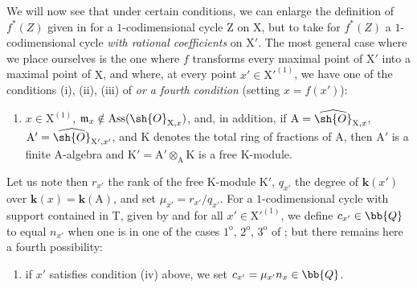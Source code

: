 \begin{env}[21.10.10]
\label{IV.21.10.10}
We will now see that under certain conditions, we can enlarge the definition of $f^*(Z)$ given in  for a $1$-codimensional cycle $\mathrm{Z}$ on $\mathrm{X}$, but to take for $f^*(Z)$ a $1$-codimensional cycle \emph{with rational coefficients} on $\mathrm{X}'$.
The most general case where we place ourselves is the one where $f$ transforms every maximal point of $\mathrm{X}'$ into a maximal point of $\mathrm{X}$, and where, at every point $x'\in\mathrm{X}'^{(1)}$, we have one of the conditions (i), (ii), (iii) of  \emph{or a fourth condition} (setting $x=f(x')$):
\begin{enumerate}
  \item[(iv)] $x\in\mathrm{X}^{(1)}$, $\mathfrak{m}_{x}\notin\operatorname{Ass}(\sh{O}_{\mathrm{X},x})$, and, in addition, if $\mathrm{A}=\widehat{\sh{O}}_{\mathrm{X},x}$, $\mathrm{A}'=\widehat{\sh{O}}_{\mathrm{X}',x'}$, and $\mathrm{K}$ denotes the total ring of fractions of $\mathrm{A}$, then $\mathrm{A}'$ is a finite $\mathrm{A}$-algebra and $\mathrm{K}'=\mathrm{A}'\otimes_{\mathrm{A}}\mathrm{K}$ is a free $\mathrm{K}$-module.
\end{enumerate}

Let us note then $r_{x'}$ the rank of the free $\mathrm{K}$-module $\mathrm{K}'$, $q_{x'}$ the degree of $\boldsymbol{k}(x')$ over $\boldsymbol{k}(x)=\boldsymbol{k}(\mathrm{A})$, and set $\mu_{x'}=r_{x'}/q_{x'}$.
For a $1$-codimensional cycle with support contained in $\mathrm{T}$, given by  and for all $x'\in\mathrm{X}'^{(1)}$, we define $c_{x'}\in\bb{Q}$ to equal $n_{x'}$ when one is in one of the cases $1^{\mathrm{o}}$, $2^{\mathrm{o}}$, $3^{\mathrm{o}}$ of ; but there remains here a fourth possibility:
\begin{enumerate}
  \item[$4^{\mathrm{o}}$] if $x'$ satisfies condition (iv) above, we set $c_{x'}=\mu_{x'}n_x\in\bb{Q}$.
\end{enumerate}
\end{env}

